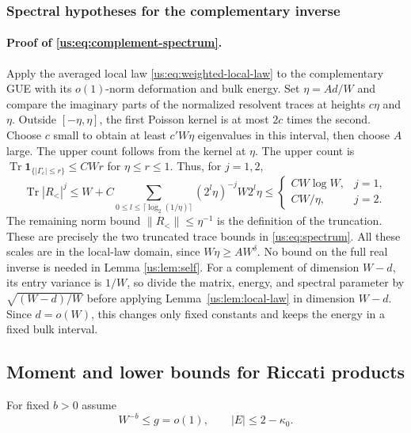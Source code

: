 \documentclass[11pt]{article}
\numberwithin{equation}{section}
\theoremstyle{remark}
\newcommand{\Tr}{\operatorname{Tr}}
\begin{document}
\subsubsection{Spectral hypotheses for the complementary inverse}
\label{app:inverse-image-spectrum}

\paragraph{Proof of \eqref{us:eq:complement-spectrum}.}
Apply the averaged local law \eqref{us:eq:weighted-local-law} to the
complementary GUE with its $o(1)$-norm deformation and bulk energy. Set
$\eta=Ad/W$ and compare the imaginary parts of the normalized resolvent
traces at heights $c\eta$ and $\eta$. Outside $[-\eta,\eta]$, the
first Poisson kernel is at most $2c$ times the second. Choose $c$ small
to obtain at least $c'W\eta$ eigenvalues in this interval, then choose
$A$ large. The upper count follows from the kernel at $\eta$.
The upper count is $\Tr\mathbf1_{\{|\Gamma_c|\le r\}}\le CWr$
for $\eta\le r\le1$. Thus, for $j=1,2$,
\[
 \Tr|R_<|^j
 \le W+C\sum_{0\le l\le\lceil\log_2(1/\eta)\rceil}
       (2^l\eta)^{-j}W2^l\eta
 \le\begin{cases}CW\log W,&j=1,\\ CW/\eta,&j=2.\end{cases}
\]
The remaining norm bound $\|R_<\|\le\eta^{-1}$ is the definition of the truncation.
These are precisely the two truncated trace bounds in \eqref{us:eq:spectrum}. All these scales are in the local-law
domain, since $W\eta\ge AW^\delta$. No bound on the full real inverse
is needed in Lemma \ref{us:lem:self}.
For a complement of dimension $W-d$, its entry variance is $1/W$,
so divide the matrix, energy, and spectral parameter by $\sqrt{(W-d)/W}$
before applying Lemma~\ref{us:lem:local-law} in dimension $W-d$.
Since $d=o(W)$, this changes only fixed constants and keeps the energy
in a fixed bulk interval.

\subsection{Moment and lower bounds for Riccati products}
\label{app:product-moment-proof}
\label{su:sec:product-proof}

For fixed $b>0$ assume
\begin{equation}\label{us:eq:preliminary-range}
 W^{-b}\le g=o(1),\qquad |E|\le2-\kappa_0.
\end{equation}
\end{document}
